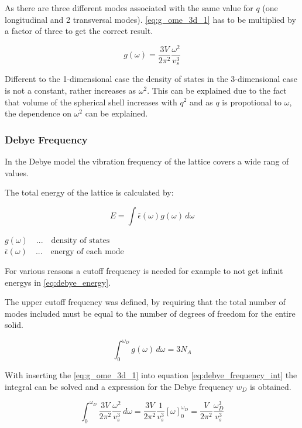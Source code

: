 As there are three different modes associated with the same value for $q$
(one longitudinal and 2 transversal modes). \autoref{eq:g_ome_3d_1} has to be
multiplied by a factor of three to get the correct result.

\begin{equation}
    g(\omega) = \frac{3V}{2\pi^2} \frac{\omega^2}{v_s^3}
    \label{eq:g_ome_3d}
\end{equation}

Different to the 1-dimensional case the density of states
in the 3-dimensional case is not a constant, rather increases
as $\omega^2$. This can be explained due to the fact that volume of the 
spherical shell increases with $q^2$ and as $q$ is propotional to 
$\omega$, the dependence on $\omega^2$ can be explained.

\subsubsection*{Debye Frequency}

In the Debye model the vibration frequency of the lattice covers
a wide rang of values.

The total energy of the lattice is calculated by:

\begin{equation}
    E = \int \overline{\epsilon}(\omega) g(\omega) \, d\omega
    \label{eq:debye_energy}
\end{equation}

$g(\omega) \quad ... \quad \textrm{density of states}$\\
$\overline{\epsilon}(\omega) \quad ... \quad \textrm{energy of each mode}$

For various reasons a cutoff frequency is needed for example to not get
infinit energys in \autoref{eq:debye_energy}.

The upper cutoff frequency was defined, by requiring that the total number of 
modes included must be equal to the number of degrees of freedom for the entire
solid.

\begin{equation}
    \int_0^{\omega_D} g(\omega) \, d\omega = 3N_A
    \label{eq:debye_frequency_int}
\end{equation}

With inserting the \autoref{eq:g_ome_3d_1} into equation 
\autoref{eq:debye_frequency_int} the integral can be solved and 
a expression for the Debye frequency $w_D$ is obtained.

$$\int_0^{\omega_D} \frac{3V}{2\pi^2} \frac{\omega^2}{v_s^3} \, d\omega = 
    \frac{3V}{2\pi^2} \frac{1}{v_s^3} \left[\omega\right]_0^{\omega_D} =
    \frac{V}{2\pi^2} \frac{\omega_D^3}{v_s^3}
$$

